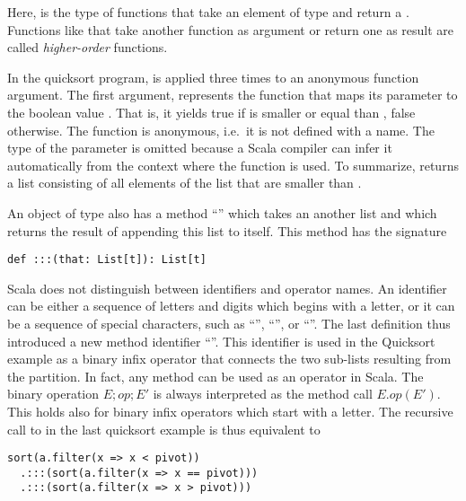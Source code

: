 \documentclass[a4paper,12pt,twoside,titlepage]{book}
\begin{document}
Here,  is the type of functions that take an element
of type  and return a .  Functions like
 that take another function as argument or return one as
result are called {\em higher-order} functions.

In the quicksort program,  is applied three times to an
anonymous function argument.  The first argument,
 represents the function that maps its parameter
 to the boolean value . That is, it yields
true if  is smaller or equal than , false
otherwise. The function is anonymous, i.e.\ it is not defined with a
name. The type of the  parameter is omitted because a Scala
compiler can infer it automatically from the context where the
function is used. To summarize, 
returns a list consisting of all elements of the list  that are
smaller than .


An object of type  also has a method ``\code{:::}''
which takes an another list and which returns the result of appending this
list to itself. This method has the signature

\begin{lstlisting}
def :::(that: List[t]): List[t]
\end{lstlisting}

Scala does not distinguish between identifiers and operator names. An
identifier can be either a sequence of letters and digits which begins
with a letter, or it can be a sequence of special characters, such as
``\code{+}'', ``\code{*}'', or ``\code{:}''.  The last definition thus
introduced a new method identifier ``\code{:::}''.  This identifier is
used in the Quicksort example as a binary infix operator that connects
the two sub-lists resulting from the partition. In fact, any method
can be used as an operator in Scala.  The binary operation $E;op;E'$
is always interpreted as the method call $E.op(E')$. This holds also
for binary infix operators which start with a letter. The recursive call
to  in the last quicksort example is thus equivalent to
\begin{lstlisting}
sort(a.filter(x => x < pivot))
  .:::(sort(a.filter(x => x == pivot)))
  .:::(sort(a.filter(x => x > pivot)))
\end{lstlisting}
\end{document}
